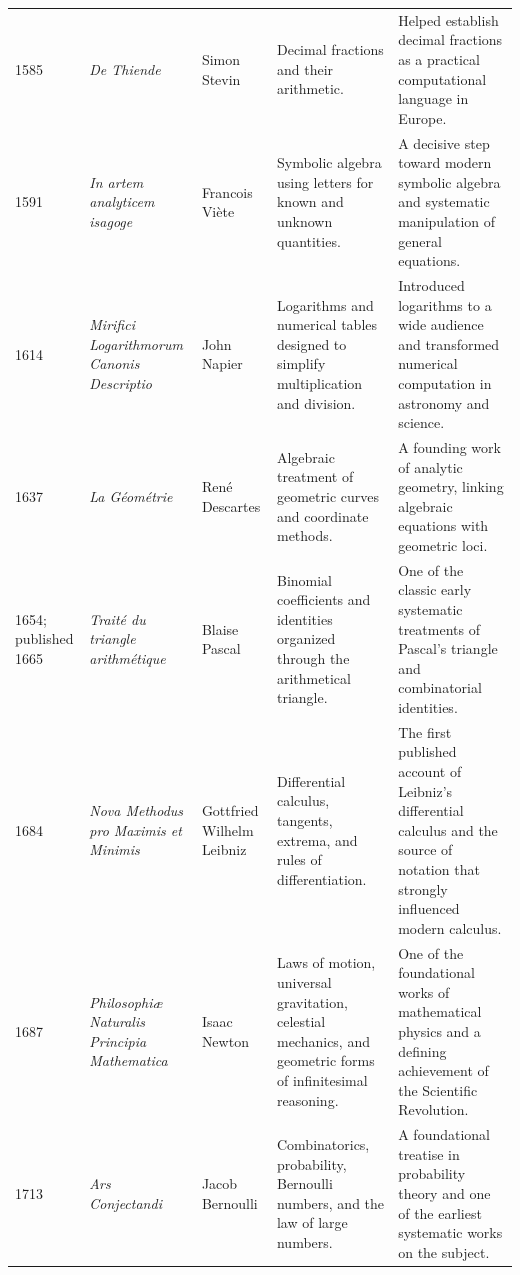{\begin{longtable}{@{}L{0.08\textwidth}L{0.21\textwidth}L{0.15\textwidth}L{0.22\textwidth}L{0.26\textwidth}@{}}
        1585
        & \textit{De Thiende}
        & Simon Stevin
        & Decimal fractions and their arithmetic.
        & Helped establish decimal fractions as a practical computational language in Europe. \\

        1591
        & \textit{In artem analyticem isagoge}
        & Francois Vi\`ete
        & Symbolic algebra using letters for known and unknown quantities.
        & A decisive step toward modern symbolic algebra and systematic manipulation of general equations. \\

        1614
        & \textit{Mirifici Logarithmorum Canonis Descriptio}
        & John Napier
        & Logarithms and numerical tables designed to simplify multiplication and division.
        & Introduced logarithms to a wide audience and transformed numerical computation in astronomy and science. \\

        1637
        & \textit{La G\'eom\'etrie}
        & Ren\'e Descartes
        & Algebraic treatment of geometric curves and coordinate methods.
        & A founding work of analytic geometry, linking algebraic equations with geometric loci. \\

        1654; published 1665
        & \textit{Trait\'e du triangle arithm\'etique}
        & Blaise Pascal
        & Binomial coefficients and identities organized through the arithmetical triangle.
        & One of the classic early systematic treatments of Pascal's triangle and combinatorial identities. \\

        1684
        & \textit{Nova Methodus pro Maximis et Minimis}
        & Gottfried Wilhelm Leibniz
        & Differential calculus, tangents, extrema, and rules of differentiation.
        & The first published account of Leibniz's differential calculus and the source of notation that strongly influenced modern calculus. \\

        1687
        & \textit{Philosophi\ae{} Naturalis Principia Mathematica}
        & Isaac Newton
        & Laws of motion, universal gravitation, celestial mechanics, and geometric forms of infinitesimal reasoning.
        & One of the foundational works of mathematical physics and a defining achievement of the Scientific Revolution. \\

        1713
        & \textit{Ars Conjectandi}
        & Jacob Bernoulli
        & Combinatorics, probability, Bernoulli numbers, and the law of large numbers.
        & A foundational treatise in probability theory and one of the earliest systematic works on the subject. \\


\end{longtable}}
